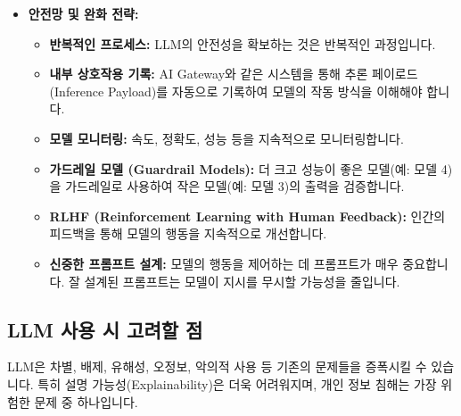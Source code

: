 \documentclass[11pt,a4paper]{article}
\theoremstyle{definition}
\begin{document}
\begin{itemize}
    \item \textbf{안전망 및 완화 전략:}
    \begin{itemize}
        \item \textbf{반복적인 프로세스:} LLM의 안전성을 확보하는 것은 반복적인 과정입니다.
        \item \textbf{내부 상호작용 기록:} AI Gateway와 같은 시스템을 통해 추론 페이로드(Inference Payload)를 자동으로 기록하여 모델의 작동 방식을 이해해야 합니다.
        \item \textbf{모델 모니터링:} 속도, 정확도, 성능 등을 지속적으로 모니터링합니다.
        \item \textbf{가드레일 모델 (Guardrail Models):} 더 크고 성능이 좋은 모델(예: 모델 4)을 가드레일로 사용하여 작은 모델(예: 모델 3)의 출력을 검증합니다.
        \item \textbf{RLHF (Reinforcement Learning with Human Feedback):} 인간의 피드백을 통해 모델의 행동을 지속적으로 개선합니다.
        \item \textbf{신중한 프롬프트 설계:} 모델의 행동을 제어하는 데 프롬프트가 매우 중요합니다. 잘 설계된 프롬프트는 모델이 지시를 무시할 가능성을 줄입니다.
    \end{itemize}
\end{itemize}

\subsection{LLM 사용 시 고려할 점}

LLM은 차별, 배제, 유해성, 오정보, 악의적 사용 등 기존의 문제들을 증폭시킬 수 있습니다. 특히 설명 가능성(Explainability)은 더욱 어려워지며, 개인 정보 침해는 가장 위험한 문제 중 하나입니다.
\end{document}
